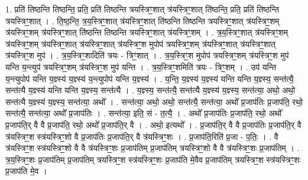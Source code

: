 \documentclass[17pt]{extarticle}
\begin{document}
1. प्रति॑ तिष्ठन्ति तिष्ठन्ति॒ प्रति॒ प्रति॑ तिष्ठन्ति त्रयस्त्रिꣳ॒॒शात् त्र॑यस्त्रिꣳ॒॒शात् ति॑ष्ठन्ति॒ प्रति॒ प्रति॑ तिष्ठन्ति त्रयस्त्रिꣳ॒॒शात् । . ति॒ष्ठ॒न्ति॒ त्र॒य॒स्त्रिꣳ॒॒शात् त्र॑यस्त्रिꣳ॒॒शात् ति॑ष्ठन्ति तिष्ठन्ति त्रयस्त्रिꣳ॒॒शात् त्र॑यस्त्रिꣳ॒॒शम् त्र॑यस्त्रिꣳ॒॒शम् त्र॑यस्त्रिꣳ॒॒शात् ति॑ष्ठन्ति तिष्ठन्ति त्रयस्त्रिꣳ॒॒शात् त्र॑यस्त्रिꣳ॒॒शम् । . त्र॒य॒स्त्रिꣳ॒॒शात् त्र॑यस्त्रिꣳ॒॒शम् त्र॑यस्त्रिꣳ॒॒शम् त्र॑यस्त्रिꣳ॒॒शात् त्र॑यस्त्रिꣳ॒॒शात् त्र॑यस्त्रिꣳ॒॒श मुपोप॑ त्रयस्त्रिꣳ॒॒शम् त्र॑यस्त्रिꣳ॒॒शात् त्र॑यस्त्रिꣳ॒॒शात् त्र॑यस्त्रिꣳ॒॒श मुप॑ । . त्र॒य॒स्त्रिꣳ॒॒शादिति॑ त्रयः - त्रिꣳ॒॒शात् । . त्र॒य॒स्त्रिꣳ॒॒श मुपोप॑ त्रयस्त्रिꣳ॒॒शम् त्र॑यस्त्रिꣳ॒॒श मुप॑ यन्ति य॒न्त्युप॑ त्रयस्त्रिꣳ॒॒शम् त्र॑यस्त्रिꣳ॒॒श मुप॑ यन्ति । . त्र॒य॒स्त्रिꣳ॒॒शमिति॑ त्रयः - त्रिꣳ॒॒शम् । . उप॑ यन्ति य॒न्त्युपोप॑ यन्ति य॒ज्ञ्स्य॑ य॒ज्ञ्स्य॑ य॒न्त्युपोप॑ यन्ति य॒ज्ञ्स्य॑ । . य॒न्ति॒ य॒ज्ञ्स्य॑ य॒ज्ञ्स्य॑ यन्ति यन्ति य॒ज्ञ्स्य॒ सन्त॑त्यै॒ सन्त॑त्यै य॒ज्ञ्स्य॑ यन्ति यन्ति य॒ज्ञ्स्य॒ सन्त॑त्यै । . य॒ज्ञ्स्य॒ सन्त॑त्यै॒ सन्त॑त्यै य॒ज्ञ्स्य॑ य॒ज्ञ्स्य॒ सन्त॑त्या॒ अथो॒ अथो॒ सन्त॑त्यै य॒ज्ञ्स्य॑ य॒ज्ञ्स्य॒ सन्त॑त्या॒ अथो᳚ । . सन्त॑त्या॒ अथो॒ अथो॒ सन्त॑त्यै॒ सन्त॑त्या॒ अथो᳚ प्र॒जाप॑तिः प्र॒जाप॑ति॒ रथो॒ सन्त॑त्यै॒ सन्त॑त्या॒ अथो᳚ प्र॒जाप॑तिः । . सन्त॑त्या॒ इति॒ सं - त॒त्यै॒ । . अथो᳚ प्र॒जाप॑तिः प्र॒जाप॑ति॒ रथो॒ अथो᳚ प्र॒जाप॑ति॒र् वै वै प्र॒जाप॑ति॒ रथो॒ अथो᳚ प्र॒जाप॑ति॒र् वै । . अथो॒ इत्यथो᳚ । . प्र॒जाप॑ति॒र् वै वै प्र॒जाप॑तिः प्र॒जाप॑ति॒र् वै त्र॑यस्त्रिꣳ॒॒श स्त्र॑यस्त्रिꣳ॒॒शो वै प्र॒जाप॑तिः प्र॒जाप॑ति॒र् वै त्र॑यस्त्रिꣳ॒॒शः । . प्र॒जाप॑ति॒रिति॑ प्र॒जा - प॒तिः॒ । . वै त्र॑यस्त्रिꣳ॒॒श स्त्र॑यस्त्रिꣳ॒॒शो वै वै त्र॑यस्त्रिꣳ॒॒शः प्र॒जाप॑तिम् प्र॒जाप॑तिम् त्रयस्त्रिꣳ॒॒शो वै वै त्र॑यस्त्रिꣳ॒॒शः प्र॒जाप॑तिम् । . त्र॒य॒स्त्रिꣳ॒॒शः प्र॒जाप॑तिम् प्र॒जाप॑तिम् त्रयस्त्रिꣳ॒॒श स्त्र॑यस्त्रिꣳ॒॒शः प्र॒जाप॑ति मे॒वैव प्र॒जाप॑तिम् त्रयस्त्रिꣳ॒॒श स्त्र॑यस्त्रिꣳ॒॒शः प्र॒जाप॑ति मे॒व । \newline
\end{document}
